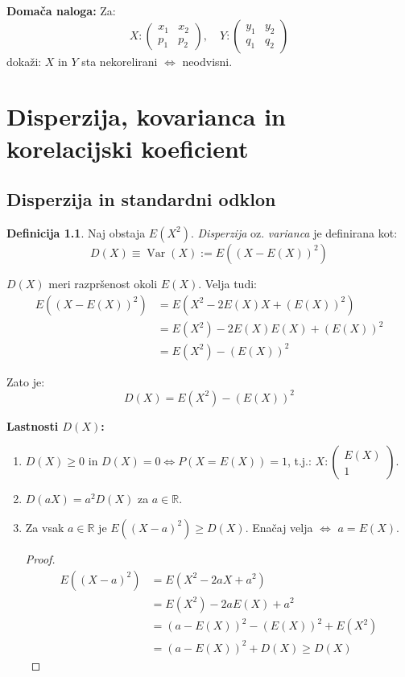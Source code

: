 \documentclass[12pt]{book}
\def\n{\noindent}
\theoremstyle{definition}
\newtheorem{definicija}{Definicija}
\theoremstyle{plain}
\theoremstyle{plain}
\theoremstyle{plain}
\theoremstyle{remark}
\begin{document}
\n \textbf{Domača naloga:} Za:
$$
X:\left(\begin{array}{cc}
    x_1 & x_2 \\
    p_1 & p_2
    \end{array}\right), \quad Y:\left(\begin{array}{cc}
    y_1 & y_2 \\
    q_1 & q_2
    \end{array}\right)
$$
dokaži: $X$ in $Y$ sta nekorelirani $\iff$ neodvisni.

\chapter[Disperzija, kovarianca in korelacijski koeficient]{Disperzija, kovarianca in\\korelacijski koeficient}

\section{Disperzija in standardni odklon}

\begin{definicija}
    Naj obstaja $E\left(X^2\right)$. \emph{Disperzija} oz. \emph{varianca} je definirana kot:
    $$
    D(X) \equiv \operatorname{Var}(X):=E\left((X-E(X))^2\right)
    $$    
\end{definicija}

\n $D(X)$ meri razpršenost okoli $E(X)$. Velja tudi: 
$$
\begin{aligned}
    E\left((X-E(X))^2\right)&=E\left(X^2-2 E(X) X+(E(X))^2\right) \\
    &=E\left(X^2\right)-2 E(X) E(X)+(E(X))^2 \\
    &=E\left(X^2\right)-(E(X))^2
\end{aligned}
$$

\n Zato je: 
$$
D(X)=E\left(X^2\right)-\left(E(X)\right)^2
$$

\n \textbf{Lastnosti $D(X)$:}

\begin{enumerate}
    \item $D(X) \geq 0 \text{ in } D(X) = 0 \iff P(X=E(X))=1$, t.j.: $X:\left(\begin{array}{c}E(X) \\ 1 \end{array}\right)$.
    \item $D(aX) = a^2 D(X)$ za $a \in \mathbb{R}$.
    \item Za vsak $a \in \mathbb{R}$ je $E\left((X-a)^2\right) \geq D(X)$. Enačaj velja $\iff$ $a=E(X)$.
    \begin{proof}
        $$
        \begin{aligned}
            E\left((X-a)^2\right)&=E\left(X^2-2 a X+a^2\right) \\
            &=E\left(X^2\right)-2 a  E(X)+a^2 \\
            &=(a-E(X))^2 - (E(X))^2+E\left(X^2\right) \\
            &=(a-E(X))^2+D(X) \geq D(X)
        \end{aligned}
        $$
    \end{proof}
\end{enumerate}
\end{document}
